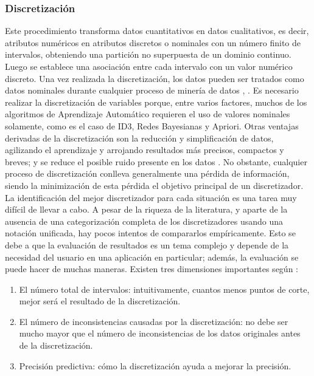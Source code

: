 \subsubsection*{Discretización} \label{sub-epigrafe-disc}
Este procedimiento transforma datos cuantitativos en datos cualitativos, es decir, atributos numéricos en atributos discretos o nominales con un número finito de intervalos, obteniendo una partición no superpuesta de un dominio continuo. Luego se establece una asociación entre cada intervalo con un valor numérico discreto. Una vez realizada la discretización, los datos pueden ser tratados como datos nominales durante cualquier proceso de minería de datos \citep{garcia2015data}, \citep{garcia2012survey}.
Es necesario realizar la discretización de variables porque, entre varios factores, muchos de los algoritmos de Aprendizaje Automático requieren el uso de valores nominales solamente, como es el caso de ID3, Redes Bayesianas y Apriori. Otras ventajas derivadas de la discretización son la reducción y simplificación de datos, agilizando el aprendizaje y arrojando resultados más precisos, compactos y breves; y se reduce el posible ruido presente en los datos \citep{garcia2012survey}. No obstante, cualquier proceso de discretización conlleva generalmente una pérdida de información, siendo la minimización de esta pérdida el objetivo principal de un discretizador.\\
La identificación del mejor discretizador para cada situación es una tarea muy difícil de llevar a cabo. A pesar de la riqueza de la literatura, y aparte de la ausencia de una categorización completa de los discretizadores usando una notación unificada, hay pocos intentos de compararlos empíricamente. Esto se debe a que la evaluación de resultados es un tema complejo y depende de la necesidad del usuario en una aplicación en particular; además, la evaluación se puede hacer de muchas maneras. Existen tres dimensiones importantes según \citep{liu2002discretization}: 
\begin{enumerate}
	\item El número total de intervalos: intuitivamente, cuantos menos puntos de corte, mejor será el resultado de la discretización.
	\item El número de inconsistencias causadas por la discretización: no debe ser mucho mayor que el número de inconsistencias de los datos originales antes de la discretización.
	\item Precisión predictiva: cómo la discretización ayuda a mejorar la precisión.
\end{enumerate}
